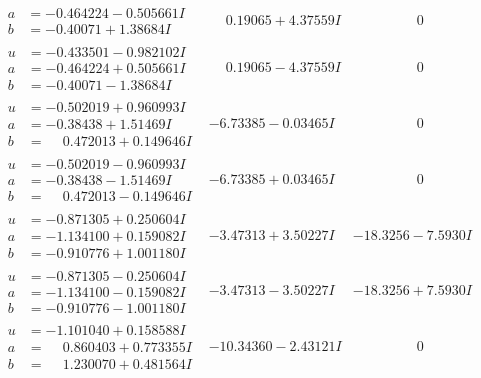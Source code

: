\documentclass[1p]{elsarticle_modified}
\theoremstyle{definition}
\begin{document}
$$\begin{array}{c|c|c}
\begin{aligned}
a &= -0.464224 - 0.505661 I \\
b &= -0.40071 + 1.38684 I\end{aligned}
 & \phantom{-}0.19065 + 4.37559 I & \phantom{-0.000000 } 0 \\ \hline\begin{aligned}
u &= -0.433501 - 0.982102 I \\
a &= -0.464224 + 0.505661 I \\
b &= -0.40071 - 1.38684 I\end{aligned}
 & \phantom{-}0.19065 - 4.37559 I & \phantom{-0.000000 } 0 \\ \hline\begin{aligned}
u &= -0.502019 + 0.960993 I \\
a &= -0.38438 + 1.51469 I \\
b &= \phantom{-}0.472013 + 0.149646 I\end{aligned}
 & -6.73385 - 0.03465 I & \phantom{-0.000000 } 0 \\ \hline\begin{aligned}
u &= -0.502019 - 0.960993 I \\
a &= -0.38438 - 1.51469 I \\
b &= \phantom{-}0.472013 - 0.149646 I\end{aligned}
 & -6.73385 + 0.03465 I & \phantom{-0.000000 } 0 \\ \hline\begin{aligned}
u &= -0.871305 + 0.250604 I \\
a &= -1.134100 + 0.159082 I \\
b &= -0.910776 + 1.001180 I\end{aligned}
 & -3.47313 + 3.50227 I & -18.3256 - 7.5930 I \\ \hline\begin{aligned}
u &= -0.871305 - 0.250604 I \\
a &= -1.134100 - 0.159082 I \\
b &= -0.910776 - 1.001180 I\end{aligned}
 & -3.47313 - 3.50227 I & -18.3256 + 7.5930 I \\ \hline\begin{aligned}
u &= -1.101040 + 0.158588 I \\
a &= \phantom{-}0.860403 + 0.773355 I \\
b &= \phantom{-}1.230070 + 0.481564 I\end{aligned}
 & -10.34360 - 2.43121 I & \phantom{-0.000000 } 0 \\ \hline\begin{aligned}

\end{aligned}
\end{array}$$
\end{document}
